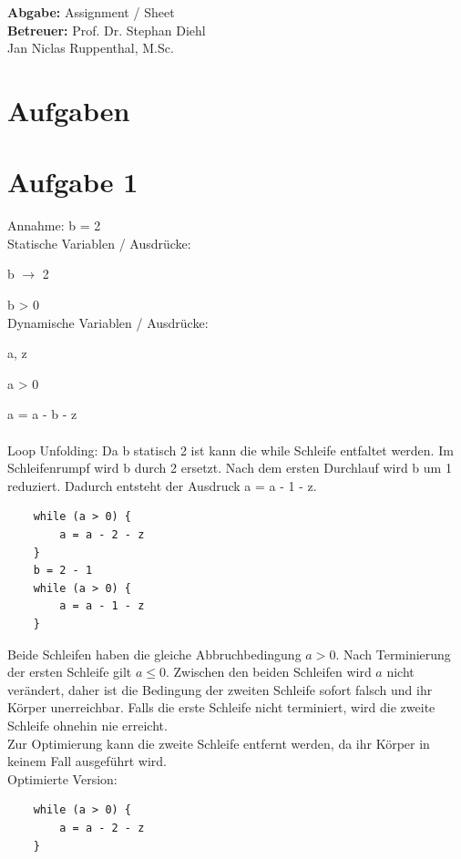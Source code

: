 \documentclass[11pt,a4paper]{article}
\title{\course}
\author{\studentname\\Matrikelnummer: \studentnumber\\\institute}
\date{\today}
\begin{document}
\maketitle

\begin{center}
    \textbf{Abgabe:} Assignment / Sheet \\
    \vspace{4mm}
    \textbf{Betreuer:} Prof. Dr. Stephan Diehl\\Jan Niclas Ruppenthal, M.Sc.
\end{center}

\bigskip

\section*{Aufgaben}

\section{Aufgabe 1}
Annahme: b = 2\\
Statische Variablen / Ausdrücke: 

    b $\rightarrow$ 2

    b > 0\\
Dynamische Variablen / Ausdrücke:

a, z

a > 0

a = a - b - z\\\\

Loop Unfolding:
Da b statisch 2 ist kann die while Schleife entfaltet werden. Im Schleifenrumpf wird b durch 2 ersetzt. Nach dem ersten Durchlauf
wird b um 1 reduziert. Dadurch entsteht der Ausdruck a = a - 1 - z.
\begin{verbatim}
    while (a > 0) {
        a = a - 2 - z
    }
    b = 2 - 1
    while (a > 0) {
        a = a - 1 - z
    }
\end{verbatim}

Beide Schleifen haben die gleiche Abbruchbedingung $a > 0$. Nach Terminierung der ersten Schleife gilt $a \le 0$. Zwischen den beiden Schleifen wird $a$ nicht verändert, daher ist die Bedingung der zweiten Schleife sofort falsch und ihr Körper unerreichbar. Falls die erste Schleife nicht terminiert, wird die zweite Schleife ohnehin nie erreicht.\\
Zur Optimierung kann die zweite Schleife entfernt werden, da ihr Körper in keinem Fall ausgeführt wird.\\
Optimierte Version:
\begin{verbatim}
    while (a > 0) {
        a = a - 2 - z
    }
\end{verbatim}
\end{document}

